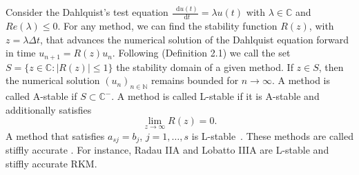 \documentclass[sn-mathphys-num]{sn-jnl}%
\newcommand*\diff{\mathop{}\!\mathrm{d}}
\newcommand{\revb}[1]{#1}%
\theoremstyle{thmstyleone}%
\theoremstyle{thmstyletwo}%
\theoremstyle{thmstylethree}%
\begin{document}
Consider the Dahlquist's test equation $\frac{\diff u(t)}{\diff t} = \lambda u(t)$ with $\lambda \in \mathbb{C}$ and $Re(\lambda) \leq 0$. 
For any method, we can find the stability function $R(z)$, with $z = \lambda \Delta t$, that advances the numerical solution of the Dahlquist equation forward in time $u_{n+1} = R(z)u_n$.
Following \citep{HairerEtAl1996_stiff} (Definition 2.1) we call the set $S = \{z \in \mathbb{C}: |R(z)| \leq 1 \}$ the stability domain of a given method. 
If $z \in S$, then the numerical solution $(u_n)_{n \in \mathbb{N}}$ remains bounded for $n \to \infty$. 
\revb{A method is called A-stable if $S \subset \mathbb{C}^{-}$.}
A method is called L-stable if it is A-stable and additionally satisfies \citep{Ehle1969}
\begin{equation}
	\lim_{z \to \infty} R(z) = 0 .
\label{Lstable}
\end{equation}
A method that satisfies $a_{sj} = b_j$, $j = 1, \dots, s$ is L-stable~\citep[Prop. 3.8]{HairerEtAl1996_stiff}. 
These methods are called stiffly accurate \citep{Prothero1974}.
For instance, Radau IIA and Lobatto IIIA are L-stable and stiffly accurate RKM.
\end{document}
